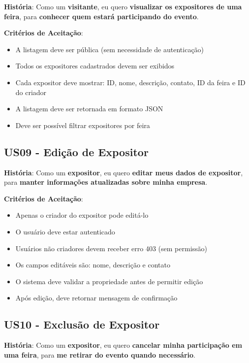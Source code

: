 \documentclass[12pt,a4paper]{article}
\begin{document}
\textbf{História}: Como um \textbf{visitante}, eu quero \textbf{visualizar os expositores de uma feira}, para \textbf{conhecer quem estará participando do evento}.

\textbf{Critérios de Aceitação}:
\begin{itemize}
    \item A listagem deve ser pública (sem necessidade de autenticação)
    \item Todos os expositores cadastrados devem ser exibidos
    \item Cada expositor deve mostrar: ID, nome, descrição, contato, ID da feira e ID do criador
    \item A listagem deve ser retornada em formato JSON
    \item Deve ser possível filtrar expositores por feira
\end{itemize}

\subsection{US09 - Edição de Expositor}

\textbf{História}: Como um \textbf{expositor}, eu quero \textbf{editar meus dados de expositor}, para \textbf{manter informações atualizadas sobre minha empresa}.

\textbf{Critérios de Aceitação}:
\begin{itemize}
    \item Apenas o criador do expositor pode editá-lo
    \item O usuário deve estar autenticado
    \item Usuários não criadores devem receber erro 403 (sem permissão)
    \item Os campos editáveis são: nome, descrição e contato
    \item O sistema deve validar a propriedade antes de permitir edição
    \item Após edição, deve retornar mensagem de confirmação
\end{itemize}

\subsection{US10 - Exclusão de Expositor}

\textbf{História}: Como um \textbf{expositor}, eu quero \textbf{cancelar minha participação em uma feira}, para \textbf{me retirar do evento quando necessário}.
\end{document}
